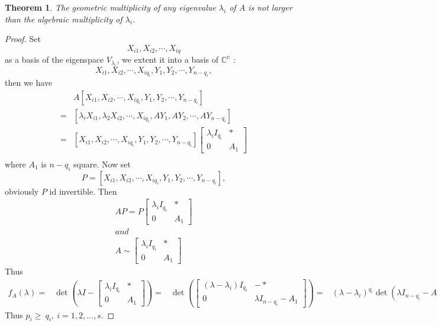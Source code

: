 \documentclass{article}
\newtheorem{theorem}{Theorem}[section]
\theoremstyle{definition}
\begin{document}
\begin{theorem}
The geometric multiplicity of any eigenvalue $\lambda_{i}$ of $A$ is not larger than the algebraic multiplicity of $\lambda_{i}$.
\end{theorem}
\begin{proof}
    Set $$X_{i1},X_{i2},\cdots,X_{iq}$$
    as a basis of the eigenspace $V_{\lambda_{i}}$, we extent it into a basis of $\mathbb{C^{n}}$ :
    $$X_{i1},X_{i2},\cdots,X_{iq_{i}},Y_{1},Y_{2},\cdots,Y_{n-q_{i}},$$
    then we have 
    \begin{align*}
        &A[X_{i1},X_{i2},\cdots,X_{iq_{i}},Y_{1},Y_{2},\cdots,Y_{n-q_{i}}]\\
        =&[\lambda_{i}X_{i1},\lambda_{2}X_{i2},\cdots,X_{iq_{i}},AY_{1},AY_{2},\cdots,AY_{n-q_{i}}]\\
        =&[X_{i1},X_{i2},\cdots,X_{iq_{i}},Y_{1},Y_{2},\cdots,Y_{n-q_{i}}]\begin{bmatrix}
            \lambda_{i}I_{q_{i}}&*\\0&A_{1}\end{bmatrix}\\
    \end{align*}
    where $A_{1}$ is $n-q_{i}$ square. Now set $$P=[X_{i1},X_{i2},\cdots,X_{iq_{i}},Y_{1},Y_{2},\cdots,Y_{n-q_{i}}],$$ 
    obviously $P$ id invertible. Then 
    \begin{align*}
        AP=P\begin{bmatrix}
            \lambda_{i}I_{q_{i}}&*\\0&A_{1}\end{bmatrix}\\
        and\\
        A\sim\begin{bmatrix}
            \lambda_{i}I_{q_{i}}&*\\0&A_{1}\end{bmatrix}
    \end{align*}
    Thus
    \begin{align*}
        f_{A}(\lambda)=&\det \left(
        \lambda I    
        -
            \begin{bmatrix}
                \lambda_{i}I_{q_{i}}&*\\0&A_{1}
            \end{bmatrix}
        \right)
        =&\det \left(
            \begin{bmatrix}
                (\lambda-\lambda_{i})I_{q_{i}}&-*\\
                0&\lambda I_{n-q_{i}}-A_{1}
            \end{bmatrix}
        \right)
        =&(\lambda-\lambda_{i})^{q_{i}}\det (\lambda I_{n-q_{i}}-A_{1})
        =&(\lambda-\lambda_{i})^{q_{i}}f_{A_{i}}(\lambda)
    \end{align*}
    Thus $p_{i}\geq \ q_{i},\ i=1,2,...,s$.
\end{proof}
\end{document}

